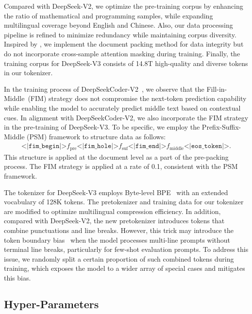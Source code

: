\documentclass[11pt, a4paper, logo, copyright, nonumbering]{deepseek}
\newcommand{\dsvii}{DeepSeek-V2}
\newcommand{\dsviii}{DeepSeek-V3}
\begin{document}
\begin{CJK*}{UTF8}{gbsn}
Compared with \dsvii{}, we optimize the pre-training corpus by enhancing the ratio of mathematical and programming samples, while expanding multilingual coverage beyond English and Chinese. 
Also, our data processing pipeline is refined to minimize redundancy while maintaining corpus diversity. 
Inspired by \citet{Ding2024FewerTI}, we implement the document packing method for data integrity but do not incorporate cross-sample attention masking during training. 
Finally, the training corpus for \dsviii{} consists of 14.8T high-quality and diverse tokens in our tokenizer. 

In the training process of DeepSeekCoder-V2~\citep{dscodervii}, we observe that the Fill-in-Middle~(FIM) strategy does not compromise the next-token prediction capability while enabling the model to accurately predict middle text based on contextual cues. 
In alignment with DeepSeekCoder-V2, we also incorporate the FIM strategy in the pre-training of \dsviii{}. 
To be specific, we employ the Prefix-Suffix-Middle (PSM) framework to structure data as follows:
\begin{align}
\texttt{<|fim\_begin|>}f_{\text{pre}}\texttt{<|fim\_hole|>}f_{\text{suf}}\texttt{<|fim\_end|>}f_{\text{middle}}\texttt{<|eos\_token|>} . \nonumber
\end{align}
This structure is applied at the document level as a part of the pre-packing process. 
The FIM strategy is applied at a rate of 0.1, consistent with the PSM framework.

The tokenizer for \dsviii{} employs Byte-level BPE~\citep{shibata1999byte} with an extended vocabulary of 128K tokens. 
The pretokenizer and training data for our tokenizer are modified to optimize multilingual compression efficiency. 
In addition, compared with \dsvii{}, the new pretokenizer introduces tokens that combine punctuations and line breaks. 
However, this trick may introduce the token boundary bias~\citep{tokenboundary} when the model processes multi-line prompts without terminal line breaks, particularly for few-shot evaluation prompts. 
To address this issue, we randomly split a certain proportion of such combined tokens during training, which exposes the model to a wider array of special cases and mitigates this bias. 

\subsection{Hyper-Parameters}


\end{CJK*}
\end{document}
